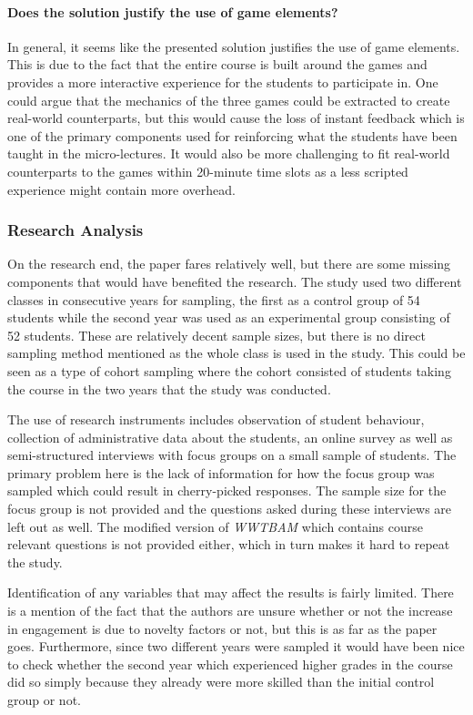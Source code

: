 \paragraph{Does the solution justify the use of game elements?}
In general, it seems like the presented solution justifies the use of game elements. This is due to the fact that the entire course is built around the games and provides a more interactive experience for the students to participate in. One could argue that the mechanics of the three games could be extracted to create real-world counterparts, but this would cause the loss of instant feedback which is one of the primary components used for reinforcing what the students have been taught in the micro-lectures. It would also be more challenging to fit real-world counterparts to the games within 20-minute time slots as a less scripted experience might contain more overhead. 

\subsubsection{Research Analysis}
On the research end, the paper fares relatively well, but there are some missing components that would have benefited the research. 
The study used two different classes in consecutive years for sampling, the first as a control group of 54 students while the second year was used as an experimental group consisting of 52 students. These are relatively decent sample sizes, but there is no direct sampling method mentioned as the whole class is used in the study. This could be seen as a type of cohort sampling where the cohort consisted of students taking the course in the two years that the study was conducted. 

The use of research instruments includes observation of student behaviour, collection of administrative data about the students, an online survey as well as semi-structured interviews with focus groups on a small sample of students. The primary problem here is the lack of information for how the focus group was sampled which could result in cherry-picked responses. The sample size for the focus group is not provided and the questions asked during these interviews are left out as well. The modified version of \emph{WWTBAM} which contains course relevant questions is not provided either, which in turn makes it hard to repeat the study. 

Identification of any variables that may affect the results is fairly limited. There is a mention of the fact that the authors are unsure whether or not the increase in engagement is due to novelty factors or not, but this is as far as the paper goes. Furthermore, since two different years were sampled it would have been nice to check whether the second year which experienced higher grades in the course did so simply because they already were more skilled than the initial control group or not. 

